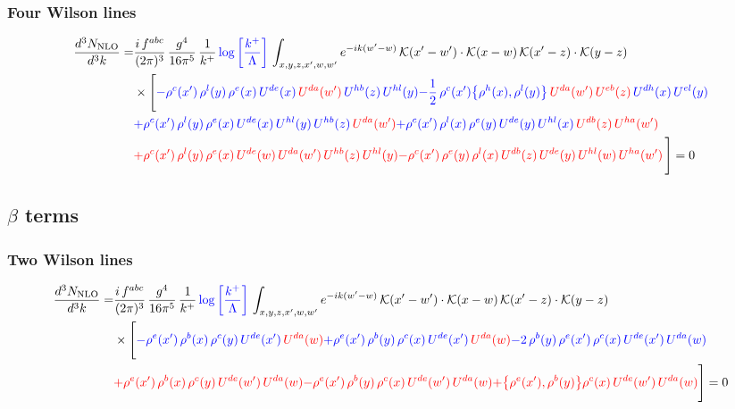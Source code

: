 \documentclass[9pt]{article}
\numberwithin{equation}{section}
\begin{document}
\subsubsection{Four Wilson lines}
\begin{align}
    \frac{d^{3}N_{\rm NLO}}{d^{3}k}= & \frac{i\,f^{abc}}{(2\pi)^{3}}\,\frac{g^{4}}{16\pi^{5}}\,\frac{1}{k^{+}}\,{\color{blue}\log{\left[\frac{k^{+}}{\Lambda}\right]}}\,\int_{x,y,z,x',w,w'}e^{-ik(w'-w)}\,\mathcal{K}(x'-w')\cdot\mathcal{K}(x-w)\,\mathcal{K}(x'-z)\cdot\mathcal{K}(y-z)\notag \\ & \times\Bigg[{\color{blue}-\rho^{c}(x')\,\rho^{l}(y)\,\rho^{e}(x)\,U^{de}(x)\,{\color{red}U^{da}(w')}\,U^{hb}(z)\,U^{hl}(y)}{\color{blue}-\frac{1}{2}\,\rho^{c}(x')\big\{\rho^{h}(x),\rho^{l}(y)\big\}\,{\color{red}U^{da}(w')}\,{\color{red}U^{eb}(z)}\,U^{dh}(x)\,U^{el}(y)}\notag \\ & {\color{blue}+\rho^{c}(x')\,\rho^{l}(y)\,\rho^{e}(x)\,U^{de}(x)\,U^{hl}(y)\,U^{hb}(z)\,{\color{red}U^{da}(w')}}{\color{blue}+\rho^{c}(x')\,\rho^{l}(x)\,\rho^{e}(y)\,U^{de}(y)\,U^{hl}(x)\,{\color{red}U^{db}(z)}\,{\color{red}U^{ha}(w')}}\notag \\ &{\color{red}+\rho^{c}(x')\,\rho^{l}(y)\,\rho^{e}(x)\,U^{de}(w)\,{\color{red}U^{da}(w')}\,U^{hb}(z)\,U^{hl}(y)}{\color{red}-\rho^{c}(x')\,\rho^{e}(y)\,\rho^{l}(x)\,{\color{red}U^{db}(z)}\,U^{de}(y)\,U^{hl}(w)\,U^{ha}(w')}\,\Bigg] = 0
\end{align}
\subsection{$\beta$ terms}
\subsubsection{Two Wilson lines}
\begin{align}
    \frac{d^{3}N_{\rm NLO}}{d^{3}k}= & \frac{i\,f^{abc}}{(2\pi)^{3}}\,\frac{g^{4}}{16\pi^{5}}\,\frac{1}{k^{+}}\,{\color{blue}\log{\left[\frac{k^{+}}{\Lambda}\right]}}\,\int_{x,y,z,x',w,w'}e^{-ik(w'-w)}\,\mathcal{K}(x'-w')\cdot\mathcal{K}(x-w)\,\mathcal{K}(x'-z)\cdot\mathcal{K}(y-z)\notag \\ & \times\Bigg[{\color{blue}-\rho^{e}(x')\,\rho^{b}(x)\,\rho^{c}(y)\,U^{de}(x')\,{\color{red}U^{da}(w)}}{\color{blue}+\rho^{e}(x')\,\rho^{b}(y)\,\rho^{c}(x)\,U^{de}(x')\,{\color{red}U^{da}(w)}}{\color{blue}-2\,\rho^{b}(y)\,\rho^{e}(x')\, \rho^{c}(x)\, U^{de}(x')\,U^{da}(w)}\notag \\ & {\color{red}+\rho^{e}(x')\,\rho^{b}(x)\,\rho^{c}(y)\,U^{de}(w')\,{\color{red}U^{da}(w)}}{\color{red}-\rho^{e}(x')\,\rho^{b}(y)\,\rho^{c}(x)\,U^{de}(w')\,{\color{red}U^{da}(w)}}{\color{red}+\big\{\rho^{e}(x'),\rho^{b}(y)\big\}\rho^{c}(x)\,U^{de}(w')\,{\color{red}U^{da}(w)}}\Bigg] = 0
\end{align}   
\end{document}

